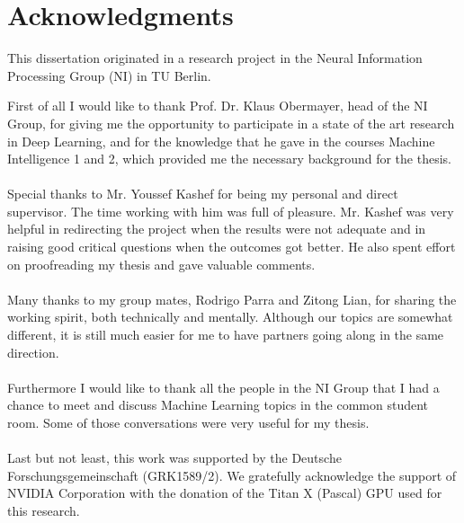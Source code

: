 


\chapter*{Acknowledgments}

\noindent This dissertation originated in a research project in the Neural Information
Processing Group (NI) in TU Berlin.

\vspace*{1cm}
\noindent 
First of all I would like to thank Prof. Dr. Klaus Obermayer, head of the NI Group, for
giving me the opportunity to participate in a state of the art research in Deep Learning,
and for the knowledge that he gave in the courses Machine Intelligence 1 and 2, which
provided me the necessary background for the thesis.
\\ 
\\
Special thanks to Mr. Youssef Kashef for being my personal and direct supervisor. The time
working with him was full of pleasure. Mr. Kashef was very helpful in redirecting the
project when the results were not adequate and in raising good critical questions when
the outcomes got better. He also spent effort on proofreading my thesis and gave valuable
comments.
\\
\\ 
Many thanks to my group mates, Rodrigo Parra and Zitong Lian, for sharing the working
spirit, both technically and mentally. Although our topics are somewhat different, it is
still much easier for me to have partners going along in the same direction.
\\ 
\\
Furthermore I would like to thank all the people in the NI Group that I had a chance to
meet and discuss Machine Learning topics in the common student room. Some of those
conversations were very useful for my thesis.
\\
\\
Last but not least, this work was supported by the Deutsche Forschungsgemeinschaft
(GRK1589/2). We gratefully acknowledge the support of NVIDIA Corporation with the donation
of the Titan X (Pascal) GPU used for this research.

